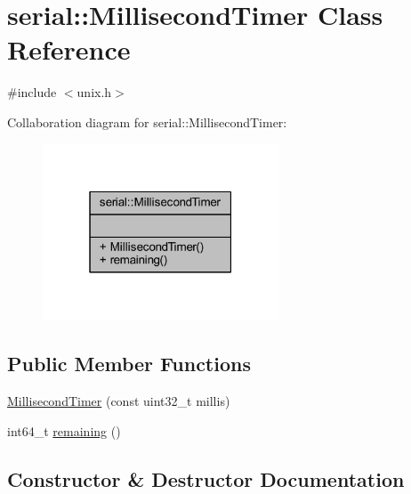 \hypertarget{classserial_1_1_millisecond_timer}{}\section{serial\+:\+:Millisecond\+Timer Class Reference}
\label{classserial_1_1_millisecond_timer}


{\ttfamily \#include $<$unix.\+h$>$}



Collaboration diagram for serial\+:\+:Millisecond\+Timer\+:\nopagebreak
\begin{figure}[H]
\begin{center}
\leavevmode
\includegraphics[width=199pt]{classserial_1_1_millisecond_timer__coll__graph}
\end{center}
\end{figure}
\subsection*{Public Member Functions}
\begin{DoxyCompactItemize}
\item 
\mbox{\hyperlink{classserial_1_1_millisecond_timer_aac5a60ab2fd6cbba430ba89eceffab86}{Millisecond\+Timer}} (const uint32\+\_\+t millis)
\item 
int64\+\_\+t \mbox{\hyperlink{classserial_1_1_millisecond_timer_a3786e2c6d8614adff0da39e1d1a2b0e3}{remaining}} ()
\end{DoxyCompactItemize}


\subsection{Constructor \& Destructor Documentation}
\mbox{\label{classserial_1_1_millisecond_timer_aac5a60ab2fd6cbba430ba89eceffab86}} 
